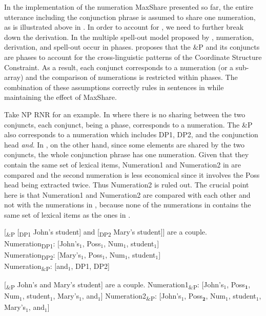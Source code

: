 \documentclass[output=paper]{langscibook}
\begin{document}
In the implementation of the numeration MaxShare presented so far, the entire utterance including the conjunction phrase is assumed to share one numeration, as is illustrated above in . In order to account for , we need to further break down the derivation. In the multiple spell-out model proposed by \citet{Uriagereka:1999a, Chomsky:2000} , numeration, derivation, and spell-out occur in phases. \citet{Oda:2017} proposes that the \&P and its conjuncts are phases to account for the cross-linguistic patterns of the Coordinate Structure Constraint. 
As a result, each conjunct corresponds to a numeration (or a sub-array) and the comparison of numerations is restricted within phases. The combination of these assumptions correctly rules in sentences in  while maintaining the effect of MaxShare. 

Take NP RNR for an example. In  where there is no sharing between the two conjuncts, each conjunct, being a phase, corresponds to a numeration. The \&P also corresponds to a numeration which includes DP1, DP2, and the conjunction head \textit{and}.  In , on the other hand, since some elements are shared by the two conjuncts, the whole conjunction phrase has one numeration. Given that they contain the same set of lexical items, Numeration1 and Numeration2 in  are compared and the second numeration is less economical since it involves the Poss head being extracted twice. Thus Numeration2 is ruled out. The crucial point here is that Numeration1 and Numeration2 are compared with each other and not with the numerations in , because none of the numerations in  contains the same set of lexical items as the ones in . 

\ea 
\label{shenex22}
[\textsubscript{\&P} [\textsubscript{DP1} John's student] and [\textsubscript{DP2} Mary's student]] are a couple.\\
Numeration\textsubscript{DP1}: [John's$_1$, Poss$_1$, Num$_1$, student$_1$]\\
Numeration\textsubscript{DP2}: [Mary's$_1$, Poss$_1$, Num$_1$, student$_1$]\\
Numeration\textsubscript{\&P}: [and$_1$, DP1, DP2]

\ex
\label{shenex23}
[\textsubscript{\&P} John's and Mary's student] are a couple.
\ea 
	Numeration1\textsubscript{\&P}: [John's$_1$, Poss$_\textbf{1}$, Num$_1$, student$_1$, Mary's$_1$, and$_1$]
\ex 
	Numeration2\textsubscript{\&P}: [John's$_1$, Poss$_\textbf{2}$, Num$_1$, student$_1$, Mary's$_1$, and$_1$]
\z 
\z 
\end{document}
